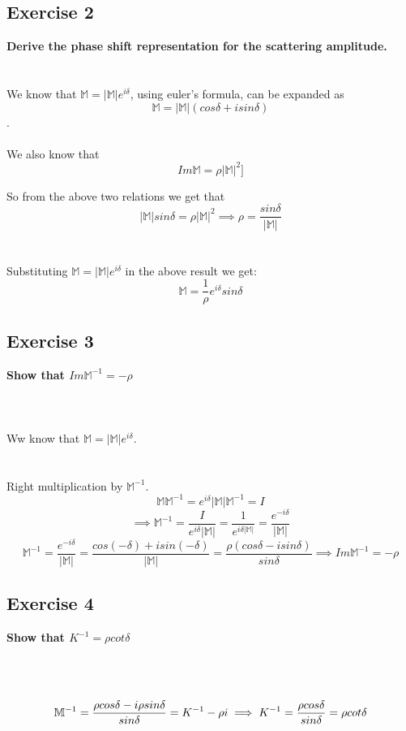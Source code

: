 \documentclass[a4paper]{article}
\begin{document}
\subsection{Exercise 2}
\textbf{Derive the phase shift representation for the scattering amplitude.}
\\ \\ \\
We know that $\mathbb{M} = |\mathbb{M}|e^{i\delta}$, using euler's formula, can be expanded as \[ \mathbb{M} = |\mathbb{M}|(cos \delta  + i sin \delta) \].
\\ \\ 
We also know that \[ Im \mathbb{M} = \rho |\mathbb{M}|^2 ]\]

So from the above two relations we get that 
\[
    |\mathbb{M}| sin \delta = \rho |\mathbb{M}|^2
    \implies   \rho = \dfrac{sin \delta}{|\mathbb{M}|} 
\] 
\\ \\
Substituting $\mathbb{M} = |\mathbb{M}|e^{i\delta}$ in the above result we get: 
\[
    \mathbb{M} = \dfrac{1}{\rho}e^{i\delta}sin \delta
\]
\subsection{Exercise 3}
\textbf{Show that $ Im \mathbb{M}^{-1} = -\rho$}
\\ \\ \\ \\
Ww know that $\mathbb{M} = |\mathbb{M}|e^{i\delta}$.\\ \\ \\Right multiplication by $\mathbb{M}^{-1}$.
\[
    \mathbb{M} \mathbb{M}^{-1} = e^{i \delta} |\mathbb{M}|\mathbb{M}^{-1} = I
\]
\[
    \implies \mathbb{M}^{-1} = \dfrac{I}{e^{i\delta}|\mathbb{M}|} = \dfrac{1}{e^{i\delta|\mathbb{M}|}} = 
    \dfrac{e^{-i\delta}}{|\mathbb{M}|}
\]
\[
    \mathbb{M}^{-1} =\dfrac{e^{-i\delta}}{|\mathbb{M}|} = \dfrac{cos(-\delta) + i sin(-\delta) }{|\mathbb{M}|} =
    \dfrac{\rho (cos \delta - i sin \delta)}{sin \delta} \implies Im \mathbb{M}^{-1} = - \rho
\]


\subsection{Exercise 4}
\textbf{Show that $K^{-1} = \rho cot \delta$}
\\ \\ \\ \\
\[
    \mathbb{M}^{-1} = \dfrac{\rho cos \delta -  i \rho sin \delta}{sin \delta} = K^{-1} - \rho i
    \\ \\
    \implies K^{-1} = \dfrac{\rho cos \delta}{sin \delta} = \rho cot \delta
\]
\end{document}
